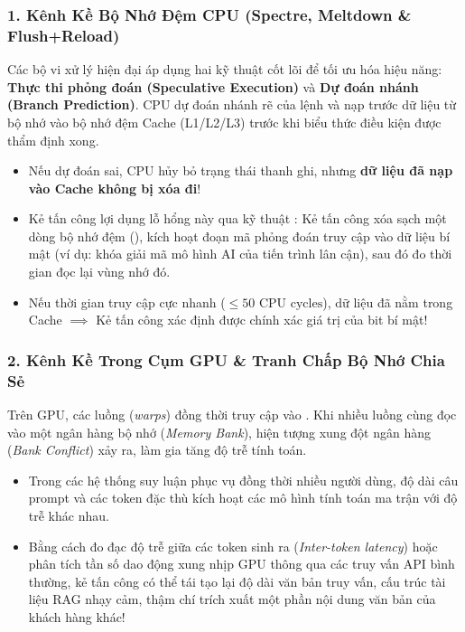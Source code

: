 \subsubsection{1. Kênh Kề Bộ Nhớ Đệm CPU (Spectre, Meltdown \& Flush+Reload)}
Các bộ vi xử lý hiện đại áp dụng hai kỹ thuật cốt lõi để tối ưu hóa hiệu năng: \textbf{Thực thi phỏng đoán (Speculative Execution)} và \textbf{Dự đoán nhánh (Branch Prediction)}. CPU dự đoán nhánh rẽ của lệnh  và nạp trước dữ liệu từ bộ nhớ vào bộ nhớ đệm Cache (L1/L2/L3) trước khi biểu thức điều kiện được thẩm định xong.
\begin{itemize}
  \item Nếu dự đoán sai, CPU hủy bỏ trạng thái thanh ghi, nhưng \textbf{dữ liệu đã nạp vào Cache không bị xóa đi}!
  \item Kẻ tấn công lợi dụng lỗ hổng này qua kỹ thuật : Kẻ tấn công xóa sạch một dòng bộ nhớ đệm (), kích hoạt đoạn mã phỏng đoán truy cập vào dữ liệu bí mật (ví dụ: khóa giải mã mô hình AI của tiến trình lân cận), sau đó đo thời gian đọc lại vùng nhớ đó.
  \item Nếu thời gian truy cập cực nhanh ($\le 50\text{ CPU cycles}$), dữ liệu đã nằm trong Cache $\implies$ Kẻ tấn công xác định được chính xác giá trị của bit bí mật!
\end{itemize}

\subsubsection{2. Kênh Kề Trong Cụm GPU \& Tranh Chấp Bộ Nhớ Chia Sẻ}
Trên GPU, các luồng (\textit{warps}) đồng thời truy cập vào . Khi nhiều luồng cùng đọc vào một ngân hàng bộ nhớ (\textit{Memory Bank}), hiện tượng xung đột ngân hàng (\textit{Bank Conflict}) xảy ra, làm gia tăng độ trễ tính toán.
\begin{itemize}
  \item Trong các hệ thống suy luận phục vụ đồng thời nhiều người dùng, độ dài câu prompt và các token đặc thù kích hoạt các mô hình tính toán ma trận với độ trễ khác nhau.
  \item Bằng cách đo đạc độ trễ giữa các token sinh ra (\textit{Inter-token latency}) hoặc phân tích tần số dao động xung nhịp GPU thông qua các truy vấn API bình thường, kẻ tấn công có thể tái tạo lại độ dài văn bản truy vấn, cấu trúc tài liệu RAG nhạy cảm, thậm chí trích xuất một phần nội dung văn bản của khách hàng khác!
\end{itemize}

